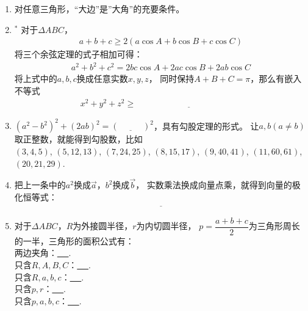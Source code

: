 \documentclass{article}
\newif\ifte
\renewcommand{\vec}{\overrightarrow}
\renewcommand\geq\geqslant
\begin{document}
\begin{multicols}{2}
\begin{enumerate}[leftmargin=20pt]
\item 对任意三角形，“大边”是”大角”的充要条件。

\item $^*$ 对于$ \Delta ABC $，
\begin{align*}
    a+b+c\geq 2(a\cos A+b\cos B+ c\cos C)
\end{align*}
将三个余弦定理的式子相加可得：
\begin{gather*}
    a^2+b^2+c^2=2bc\cos A+2ac\cos B+ 2ab\cos C
\end{gather*}
将上式中的$ a,b,c $换成任意实数$ x,y,z $，
同时保持$ A+B+C=\pi $，那么有嵌入不等式
\begin{align*}
    x^2+y^2+z^2 \geq \underline{\ \ifte 2yz\cos A+
    2zx\cos B + 2xy\cos C\else \hspace{5cm} \fi\ }
\end{align*}

\item $ (a^2-b^2)^2+(2ab)^2=(\underline{\ \ifte a^2+b^2
    \else \hspace{1cm} \fi\ })^2 $，具有勾股定理的形式。
让$ a,b (a\neq b) $取正整数，就能得到勾股数，比如 \\ 
$ (3,4,5) $, $ (5,12,13) $, $ (7,24,25) $, $ (8,15,17) $, 
$ (9,40,41) $, $ (11,60,61) $, $ (20,21,29) $.

\item 把上一条中的$ a^2 $换成$ \vec{a} $，$ b^2 $换成$ \vec{b} $，
实数乘法换成向量点乘，就得到向量的极化恒等式：
\begin{gather*}
    \underline{\ \ifte 4 \vec{a}\cdot \vec{b}=
    (\vec{a}+\vec{b})^2-(\vec{a}-\vec{b})^2\else \hspace{6cm} \fi\ }
\end{gather*}

\item 对于$ \Delta ABC $，$ R $为外接圆半径，$ r $为内切圆半径，
$ p=\dfrac{a+b+c}{2} $为三角形周长的一半，三角形的面积公式有：\\
两边夹角：\underline{\ \ifte $ \dfrac{1}{2}ab\sin C=\dfrac{1}{2}
bc\sin A=\dfrac{1}{2}ac\sin B $\else \hspace{6cm} \fi\ }. \\
只含$ R,A,B,C $：\underline{\ \ifte 
$ 2R^2\sin A\sin B\sin C $\else \hspace{2cm} \fi\ }. \\
只含$ R,a,b,c $：\underline{\ \ifte 
$ \dfrac{abc}{4R} $\else \hspace{2cm} \fi\ }. \\
只含$ p,r $：\underline{\ \ifte $ pr $\else \hspace{2cm} \fi\ }.\\
只含$ p,a,b,c $：\underline{\ \ifte 
$ \sqrt{p(p-a)(p-b)(p-c)} $\else \hspace{4cm} \fi\ }. 


\end{enumerate}
\end{multicols}
\end{document}
